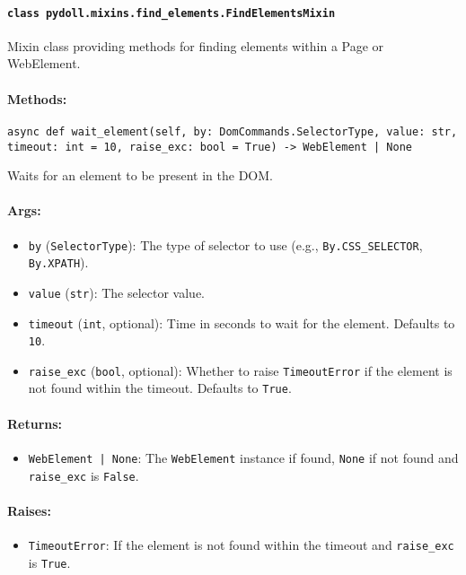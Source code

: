 \documentclass{article}
\begin{document}
\paragraph*{\texttt{class pydoll.mixins.find\_elements.FindElementsMixin}}
\noindent Mixin class providing methods for finding elements within a Page or WebElement.

\paragraph{Methods:}
\noindent\texttt{async def wait\_element(self, by: DomCommands.SelectorType, value: str, timeout: int = 10, raise\_exc: bool = True) -> WebElement | None}

\noindent Waits for an element to be present in the DOM.

\paragraph{Args:}
\begin{itemize}
    \item \texttt{by} (\texttt{SelectorType}): The type of selector to use (e.g., \texttt{By.CSS\_SELECTOR}, \texttt{By.XPATH}).
    \item \texttt{value} (\texttt{str}): The selector value.
    \item \texttt{timeout} (\texttt{int}, optional): Time in seconds to wait for the element. Defaults to \texttt{10}.
    \item \texttt{raise\_exc} (\texttt{bool}, optional): Whether to raise \texttt{TimeoutError} if the element is not found within the timeout. Defaults to \texttt{True}.
\end{itemize}

\paragraph{Returns:}
\begin{itemize}
    \item \texttt{WebElement | None}: The \texttt{WebElement} instance if found, \texttt{None} if not found and \texttt{raise\_exc} is \texttt{False}.
\end{itemize}

\paragraph{Raises:}
\begin{itemize}
    \item \texttt{TimeoutError}: If the element is not found within the timeout and \texttt{raise\_exc} is \texttt{True}.
\end{itemize}
\end{document}
